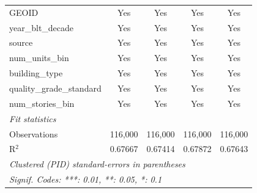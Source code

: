 \begin{tabular}{lcccc}
   GEOID                                                             & Yes            & Yes             & Yes             & Yes\\  
   year\_blt\_decade                                                 & Yes            & Yes             & Yes             & Yes\\  
   source                                                            & Yes            & Yes             & Yes             & Yes\\  
   num\_units\_bin                                                   & Yes            & Yes             & Yes             & Yes\\  
   building\_type                                                    & Yes            & Yes             & Yes             & Yes\\  
   quality\_grade\_standard                                          & Yes            & Yes             & Yes             & Yes\\  
   num\_stories\_bin                                                 & Yes            & Yes             & Yes             & Yes\\  
   \midrule
   \emph{Fit statistics}\\
   Observations                                                      & 116,000        & 116,000         & 116,000         & 116,000\\  
   R$^2$                                                             & 0.67667        & 0.67414         & 0.67872         & 0.67643\\  
   \midrule \midrule
   \multicolumn{5}{l}{\emph{Clustered (PID) standard-errors in parentheses}}\\
   \multicolumn{5}{l}{\emph{Signif. Codes: ***: 0.01, **: 0.05, *: 0.1}}\\
\end{tabular}
\par\endgroup

